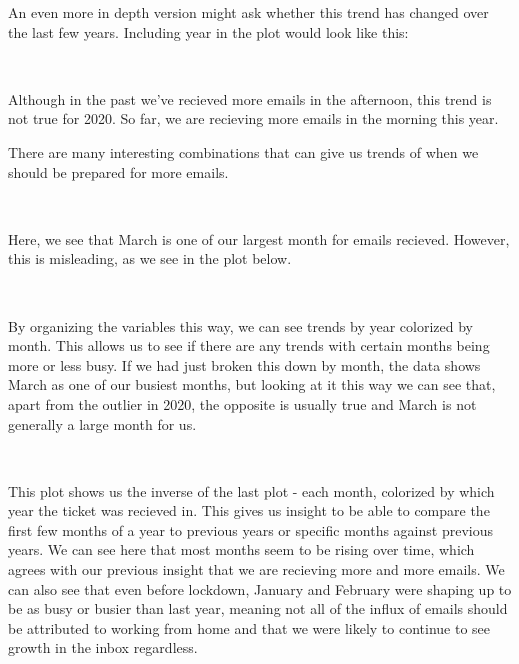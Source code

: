 \documentclass[11pt]{article}
\begin{document}
    An even more in depth version might ask whether this trend has changed
over the last few years. Including year in the plot would look like
this:

    \begin{center}
    \end{center}
    { \hspace*{\fill} \\}
    
    Although in the past we've recieved more emails in the afternoon, this
trend is not true for 2020. So far, we are recieving more emails in the
morning this year.

There are many interesting combinations that can give us trends of when
we should be prepared for more emails.

    \begin{center}
    \end{center}
    { \hspace*{\fill} \\}
    
    Here, we see that March is one of our largest month for emails recieved.
However, this is misleading, as we see in the plot below.

    \begin{center}
    \end{center}
    { \hspace*{\fill} \\}
    
    By organizing the variables this way, we can see trends by year
colorized by month. This allows us to see if there are any trends with
certain months being more or less busy. If we had just broken this down
by month, the data shows March as one of our busiest months, but looking
at it this way we can see that, apart from the outlier in 2020, the
opposite is usually true and March is not generally a large month for
us.

    \begin{center}
    \end{center}
    { \hspace*{\fill} \\}
    
    This plot shows us the inverse of the last plot - each month, colorized
by which year the ticket was recieved in. This gives us insight to be
able to compare the first few months of a year to previous years or
specific months against previous years. We can see here that most months
seem to be rising over time, which agrees with our previous insight that
we are recieving more and more emails. We can also see that even before
lockdown, January and February were shaping up to be as busy or busier
than last year, meaning not all of the influx of emails should be
attributed to working from home and that we were likely to continue to
see growth in the inbox regardless.
\end{document}
